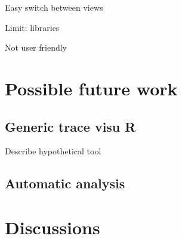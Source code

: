 Easy switch between views

Limit: libraries

Not user friendly

\section{Possible future work}

\subsection{Generic trace visu R}

Describe hypothetical tool

\subsection{Automatic analysis}

\section{Discussions}

